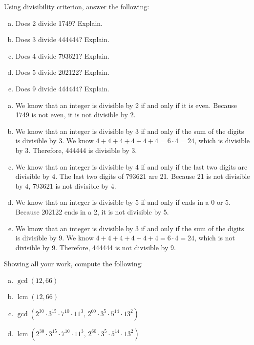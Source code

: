 \documentclass[11pt,letterpaper]{article}
\DeclareMathOperator{\lcm}{lcm}
\begin{document}
\newpage



 Using divisibility criterion, answer the following:
	\begin{enumerate}[(a)]
	\item Does 2 divide 1749? Explain.
	\item Does 3 divide 444444? Explain.
	\item Does 4 divide 793621? Explain.
	\item Does 5 divide 202122? Explain.
	\item Does 9 divide 444444? Explain. 
	\end{enumerate} \pspace

\sol 
\begin{enumerate}[(a)]
\item We know that an integer is divisible by 2 if and only if it is even. Because 1749 is not even, it is not divisible by 2. \pspace

\item We know that an integer is divisible by 3 if and only if the sum of the digits is divisible by 3. We know $4 + 4 + 4 + 4 + 4 + 4= 6 \cdot 4= 24$, which is divisible by 3. Therefore, 444444 is divisible by 3. \pspace

\item We know that an integer is divisible by 4 if and only if the last two digits are divisible by 4. The last two digits of 793621 are 21. Because 21 is not divisible by 4, 793621 is not divisible by 4. \pspace

\item We know that an integer is divisible by 5 if and only if ends in a 0 or 5. Because 202122 ends in a 2, it is not divisible by 5. \pspace

\item We know that an integer is divisible by 3 if and only if the sum of the digits is divisible by 9. We know $4 + 4 + 4 + 4 + 4 + 4= 6 \cdot 4= 24$, which is not divisible by 9. Therefore, 444444 is not divisible by 9. 
\end{enumerate}



\newpage



 Showing all your work, compute the following:
	\begin{enumerate}[(a)]
	\item $\gcd(12, 66)$
	\item $\lcm(12, 66)$
	\item $\gcd(2^{30} \cdot 3^{15} \cdot 7^{10} \cdot 11^3,\, 2^{60} \cdot 3^{5} \cdot 5^{14} \cdot 13^2)$
	\item $\lcm(2^{30} \cdot 3^{15} \cdot 7^{10} \cdot 11^3,\, 2^{60} \cdot 3^{5} \cdot 5^{14} \cdot 13^2)$
	\end{enumerate} \pspace
\end{document}
